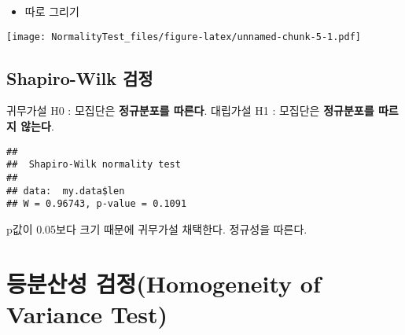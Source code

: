\documentclass[
]{article}
\newenvironment{Shaded}{\begin{snugshade}}{\end{snugshade}}
\newcommand{\AttributeTok}[1]{\textcolor[rgb]{0.77,0.63,0.00}{#1}}
\newcommand{\DecValTok}[1]{\textcolor[rgb]{0.00,0.00,0.81}{#1}}
\newcommand{\DocumentationTok}[1]{\textcolor[rgb]{0.56,0.35,0.01}{\textbf{\textit{#1}}}}
\newcommand{\FunctionTok}[1]{\textcolor[rgb]{0.00,0.00,0.00}{#1}}
\newcommand{\NormalTok}[1]{#1}
\newcommand{\SpecialCharTok}[1]{\textcolor[rgb]{0.00,0.00,0.00}{#1}}
\providecommand{\tightlist}{%
  \setlength{\itemsep}{0pt}\setlength{\parskip}{0pt}}
\begin{document}
\begin{itemize}
\tightlist
\item
  따로 그리기
\end{itemize}

\begin{Shaded}
\end{Shaded}

\texttt{[image: NormalityTest\_files/figure-latex/unnamed-chunk-5-1.pdf]}

\hypertarget{shapiro-wilk-uxac80uxc815}{%
\subsection{Shapiro-Wilk 검정}\label{shapiro-wilk-uxac80uxc815}}

귀무가설 H0 : 모집단은 \textbf{정규분포를 따른다}.
대립가설 H1 : 모집단은 \textbf{정규분포를 따르지 않는다}.

\begin{Shaded}
\end{Shaded}

\begin{verbatim}
## 
##  Shapiro-Wilk normality test
## 
## data:  my.data$len
## W = 0.96743, p-value = 0.1091
\end{verbatim}

\begin{Shaded}
\end{Shaded}

p값이 0.05보다 크기 때문에
귀무가설 채택한다.
정규성을 따른다.

\hypertarget{uxb4f1uxbd84uxc0b0uxc131-uxac80uxc815homogeneity-of-variance-test}{%
\section{등분산성 검정(Homogeneity of Variance Test)}\label{uxb4f1uxbd84uxc0b0uxc131-uxac80uxc815homogeneity-of-variance-test}}
\end{document}
